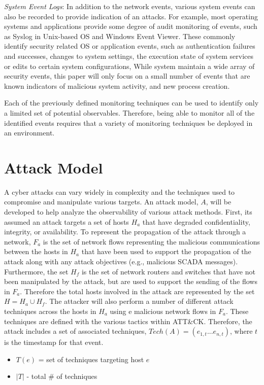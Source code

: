 \documentclass[journal]{IEEEtran}
\begin{document}
{\it System Event Logs}: In addition to the network events, various system events can also be recorded to provide indication of an attacks. For example, most operating systems and applications provide some degree of audit monitoring of events, such as Syslog in Unix-based OS and Windows Event Viewer. These commonly identify security related OS or application events, such as authentication failures and successes, changes to system settings, the execution state of system services or edits to certain system configurations,  While system maintain a wide array of security events, this paper will only focus on a small number of events that are known indicators of malicious system activity, and new process creation. 

Each of the previously defined monitoring techniques can be used to identify only a limited set of potential observables. Therefore, being able to monitor all of the identified events requires that a variety of monitoring techniques be deployed in an environment. 


\section{Attack Model}
A cyber attacks can vary widely in complexity and the techniques used to compromise and manipulate various targets. An attack model, $A$, will be developed to help analyze the observability of various attack methods. First, its assumed an attack targets a set of hosts $H_{a}$ that have degraded confidentiality, integrity, or availability. To represent the propagation of the attack through a network, $F_{a}$ is the set of network flows representing the malicious communications between the hosts in $H_{a}$ that have been used to support the propagation of the attack along with any attack objectives (e.g., malicious SCADA messages). Furthermore, the set $H_{f}$ is the set of network routers and switches that have not been manipulated by the attack, but are used to support the sending of the flows in $F_{a}$. Therefore the total hosts involved in the attack are represented by the set $H = H_{a} \cup H_{f}$.  The attacker will also perform a number of different attack techniques  across the hosts in $H_{a}$ using e malicious network flows in $F_{a}$. These techniques are defined with the various tactics within ATT\&CK. Therefore, the attack includes a set of associated techniques, $Tech(A) = (e_{1,t} ... e_{n,t})$, where $t$ is the timestamp for that event. 

\begin{itemize}
\item $T(e)$ = set of techniques targeting host $e$
\item $|T|$ - total \# of techniques
\end{itemize}
\end{document}
